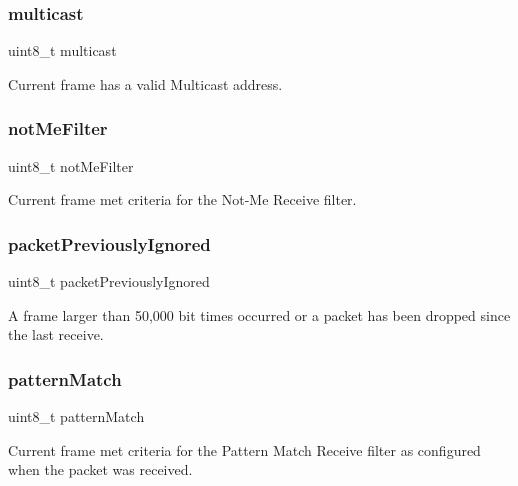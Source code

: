 \subsubsection{\texorpdfstring{multicast}{multicast}}
{\footnotesize\ttfamily uint8\+\_\+t multicast}



Current frame has a valid Multicast address. 

\mbox{\label{struct_r_s_v__t_a3c6d714f4e9f6e6a8f1d5ab5cf3d4b58}} 
\subsubsection{\texorpdfstring{notMeFilter}{notMeFilter}}
{\footnotesize\ttfamily uint8\+\_\+t not\+Me\+Filter}



Current frame met criteria for the Not-\/\+Me Receive filter. 

\mbox{\label{struct_r_s_v__t_a91c26b9645e5edca1e4c4f13c76631a2}} 
\subsubsection{\texorpdfstring{packetPreviouslyIgnored}{packetPreviouslyIgnored}}
{\footnotesize\ttfamily uint8\+\_\+t packet\+Previously\+Ignored}



A frame larger than 50,000 bit times occurred or a packet has been dropped since the last receive. 

\mbox{\label{struct_r_s_v__t_a0b0c5f947dcfec316373912a9d8afad0}} 
\subsubsection{\texorpdfstring{patternMatch}{patternMatch}}
{\footnotesize\ttfamily uint8\+\_\+t pattern\+Match}



Current frame met criteria for the Pattern Match Receive filter as configured when the packet was received. 

